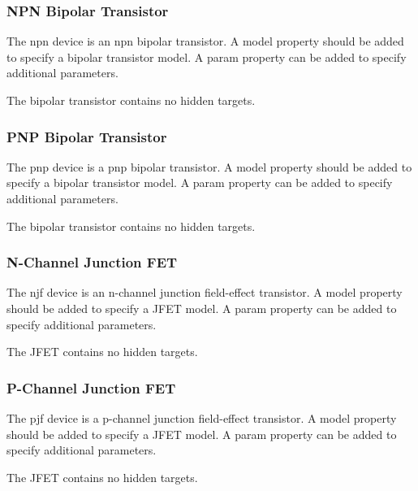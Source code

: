 \subsubsection{NPN Bipolar Transistor}

The {\et npn} device is an npn bipolar transistor.  A {\et model}
property should be added to specify a bipolar transistor model.  A
{\et param} property can be added to specify additional parameters.

The bipolar transistor contains no hidden targets.

\subsubsection{PNP Bipolar Transistor}

The {\et pnp} device is a pnp bipolar transistor.  A {\et model}
property should be added to specify a bipolar transistor model.  A
{\et param} property can be added to specify additional parameters.

The bipolar transistor contains no hidden targets.

\subsubsection{N-Channel Junction FET}

The {\et njf} device is an n-channel junction field-effect transistor. 
A {\et model} property should be added to specify a JFET model.  A
{\et param} property can be added to specify additional parameters.

The JFET contains no hidden targets.

\subsubsection{P-Channel Junction FET}

The {\et pjf} device is a p-channel junction field-effect transistor. 
A {\et model} property should be added to specify a JFET model.  A
{\et param} property can be added to specify additional parameters.

The JFET contains no hidden targets.

